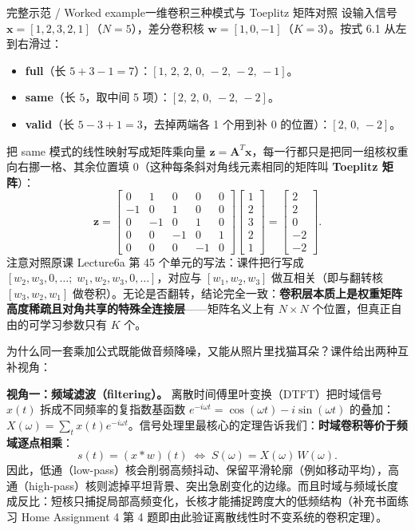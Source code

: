 \begin{StudyBlock}{完整示范 / Worked example}{一维卷积三种模式与 Toeplitz 矩阵对照}
设输入信号 $\mathbf{x}=[1,2,3,2,1]$（$N=5$），差分卷积核 $\mathbf{w}=[1,0,-1]$（$K=3$）。按式 6.1 从左到右滑过：
\begin{itemize}
\item \textbf{full}（长 $5+3-1=7$）：$[1,\,2,\,2,\,0,\,-2,\,-2,\,-1]$。
\item \textbf{same}（长 $5$，取中间 5 项）：$[2,\,2,\,0,\,-2,\,-2]$。
\item \textbf{valid}（长 $5-3+1=3$，去掉两端各 1 个用到补 0 的位置）：$[2,\,0,\,-2]$。
\end{itemize}
把 same 模式的线性映射写成矩阵乘向量 $\mathbf{z}=\mathbf{A}^T\mathbf{x}$，每一行都只是把同一组核权重向右挪一格、其余位置填 0（这种每条斜对角线元素相同的矩阵叫 \textbf{Toeplitz 矩阵}）：
\[
\mathbf{z} =
\begin{bmatrix}
0 & 1 & 0 & 0 & 0 \\
-1 & 0 & 1 & 0 & 0 \\
0 & -1 & 0 & 1 & 0 \\
0 & 0 & -1 & 0 & 1 \\
0 & 0 & 0 & -1 & 0
\end{bmatrix}
\begin{bmatrix}1\\2\\3\\2\\1\end{bmatrix}
=
\begin{bmatrix}2\\2\\0\\-2\\-2\end{bmatrix}.
\tag{6.3}
\]
注意对照原课 Lecture6a 第 45 个单元的写法：课件把行写成 $[w_2, w_3, 0,\dots;\; w_1, w_2, w_3, 0,\dots]$，对应与 $[w_1,w_2,w_3]$ 做互相关（即与翻转核 $[w_3,w_2,w_1]$ 做卷积）。无论是否翻转，结论完全一致：\textbf{卷积层本质上是权重矩阵高度稀疏且对角共享的特殊全连接层}——矩阵名义上有 $N\times N$ 个位置，但真正自由的可学习参数只有 $K$ 个。
\end{StudyBlock}


为什么同一套乘加公式既能做音频降噪，又能从照片里找猫耳朵？课件给出两种互补视角：

\textbf{视角一：频域滤波（filtering）。} 离散时间傅里叶变换（DTFT）把时域信号 $x(t)$ 拆成不同频率的复指数基函数 $e^{-i\omega t}=\cos(\omega t)-i\sin(\omega t)$ 的叠加：$X(\omega)=\sum_t x(t)e^{-i\omega t}$。信号处理里最核心的定理告诉我们：\textbf{时域卷积等价于频域逐点相乘}：
\[
s(t) = (x * w)(t) \;\Longleftrightarrow\; S(\omega) = X(\omega)\,W(\omega).
\tag{6.4}
\]
因此，低通（low-pass）核会削弱高频抖动、保留平滑轮廓（例如移动平均），高通（high-pass）核则滤掉平坦背景、突出急剧变化的边缘。而且时域与频域长度成反比：短核只捕捉局部高频变化，长核才能捕捉跨度大的低频结构（补充书面练习 Home Assignment 4 第 4 题即由此验证离散线性时不变系统的卷积定理）。

